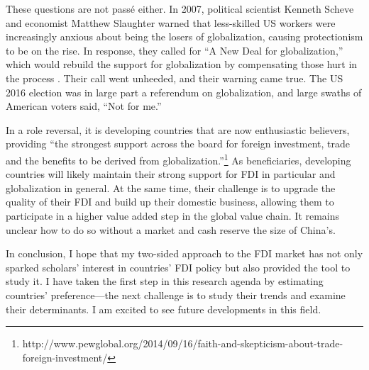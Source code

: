 These questions are not pass\'e either. In 2007, political scientist Kenneth
Scheve and economist Matthew Slaughter warned that less-skilled US workers were
increasingly anxious about being the losers of globalization, causing
protectionism to be on the rise. In response, they called for ``A New Deal for
globalization,'' which would rebuild the support for globalization by
compensating those hurt in the process \citep{Scheve2007}. Their call went
unheeded, and their warning came true. The US 2016 election was in large part a
referendum on globalization, and large swaths of American voters said, ``Not for
me.''

In a role reversal, it is developing countries that are now enthusiastic
believers, providing ``the strongest support across the board for foreign
investment, trade and the benefits to be derived from
globalization.''\footnote{http://www.pewglobal.org/2014/09/16/faith-and-skepticism-about-trade-foreign-investment/}
As beneficiaries, developing countries will likely maintain their strong support
for FDI in particular and globalization in general. At the same time, their
challenge is to upgrade the quality of their FDI and build up their domestic
business, allowing them to participate in a higher value added step in the
global value chain. It remains unclear how to do so without a market and cash reserve
the size of China's.

In conclusion, I hope that my two-sided approach to the FDI market has not only
sparked scholars' interest in countries' FDI policy but also provided the tool
to study it. I have taken the first step in this research agenda by estimating
countries' preference---the next challenge is to study their trends and examine
their determinants. I am excited to see future developments in this field.

